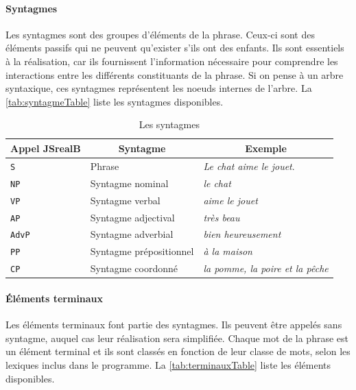 \documentclass[11pt]{article} %
\newcommand{\system}[1]{\textsf{#1}}
\newcommand{\JSB}{\system{JSrealB}}
\newcommand{\real}[1]{\emph{#1}}
\begin{document}
\paragraph{Syntagmes}

Les syntagmes sont des groupes d'éléments de la phrase. Ceux-ci sont
des éléments passifs qui ne peuvent qu'exister s'ils ont des enfants.
Ils sont essentiels à la réalisation, car ils fournissent l'information
nécessaire pour comprendre les interactions entre les différents constituants
de la phrase. Si on pense à un arbre syntaxique, ces syntagmes représentent
les noeuds internes de l'arbre. La \autoref{tab:syntagmeTable} liste les syntagmes disponibles.
\begin{table}[ht]
\centering
\caption{Les syntagmes}
\begin{tabular}{|l|l|l|}
\hline 
\multicolumn{1}{|c}{Appel \JSB{}}  & \multicolumn{1}{|c}{Syntagme} & \multicolumn{1}{|c|}{Exemple}\\
\hline 
\hline 
\texttt{S} & Phrase & \real{Le chat aime le jouet}.\\
\hline 
\texttt{NP} & Syntagme nominal & \real{le chat}\\
\hline 
\texttt{VP} & Syntagme verbal & \real{aime le jouet}\\
\hline 
\texttt{AP} & Syntagme adjectival & \real{très beau}\\
\hline 
\texttt{AdvP} & Syntagme adverbial & \real{bien heureusement}\\
\hline 
\texttt{PP} & Syntagme prépositionnel & \real{à la maison}\\
\hline 
\texttt{CP} & Syntagme coordonné & \real{la pomme, la poire et la pêche}\\
\hline 
\end{tabular}

\label{tab:syntagmeTable}
\end{table}


\paragraph{Éléments terminaux}

Les éléments terminaux font partie des syntagmes. Ils peuvent être
appelés sans syntagme, auquel cas leur réalisation sera simplifiée.
Chaque mot de la phrase est un élément terminal et ils sont classés
en fonction de leur classe de mots, selon les lexiques inclus dans le
programme. La \autoref{tab:terminauxTable} liste les éléments disponibles.
\end{document}
